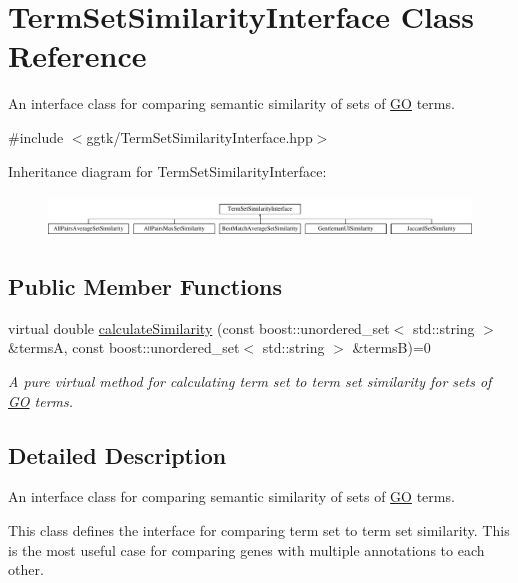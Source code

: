 \hypertarget{classTermSetSimilarityInterface}{}\section{Term\+Set\+Similarity\+Interface Class Reference}
\label{classTermSetSimilarityInterface}


An interface class for comparing semantic similarity of sets of \hyperlink{namespaceGO}{GO} terms.  




{\ttfamily \#include $<$ggtk/\+Term\+Set\+Similarity\+Interface.\+hpp$>$}

Inheritance diagram for Term\+Set\+Similarity\+Interface\+:\begin{figure}[H]
\begin{center}
\leavevmode
\includegraphics[height=1.137056cm]{classTermSetSimilarityInterface}
\end{center}
\end{figure}
\subsection*{Public Member Functions}
\begin{DoxyCompactItemize}
\item 
virtual double \hyperlink{classTermSetSimilarityInterface_aeb985b714efc3df40e55bdd31e425e04}{calculate\+Similarity} (const boost\+::unordered\+\_\+set$<$ std\+::string $>$ \&termsA, const boost\+::unordered\+\_\+set$<$ std\+::string $>$ \&termsB)=0
\begin{DoxyCompactList}\small\item\em A pure virtual method for calculating term set to term set similarity for sets of \hyperlink{namespaceGO}{GO} terms. \end{DoxyCompactList}\end{DoxyCompactItemize}


\subsection{Detailed Description}
An interface class for comparing semantic similarity of sets of \hyperlink{namespaceGO}{GO} terms. 

This class defines the interface for comparing term set to term set similarity. This is the most useful case for comparing genes with multiple annotations to each other. 

